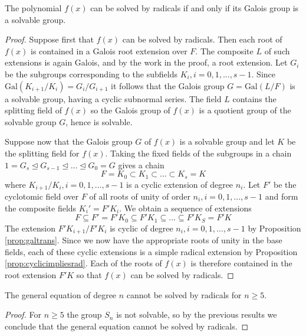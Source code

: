 \documentclass[12pt, a4paper, oneside, openright, titlepage]{book}
\begin{document}
\begin{thm}
    The polynomial $f(x)$ can be solved by radicals if and only if its Galois group is a solvable group.
\end{thm}
\begin{proof}
    Suppose first that $f(x)$ can be solved by radicals. Then each root of $f(x)$ is contained in a Galois root extension over $F$. The composite $L$ of such extensions is again Galois, and by the work in the proof, a root extension. Let $G_i$ be the subgroups corresponding to the subfields $K_i, i = 0,1,...,s-1$. Since $\text{Gal}(K_{i+1}/K_i)= G_i/G_{i+1}$ it follows that the Galois group $G = \text{Gal}(L/F)$ is a solvable group, having a cyclic subnormal series. The field $L$ contains the splitting field of $f(x)$ so the Galois group of $f(x)$ is a quotient group of the solvable group $G$, hence is solvable.

    Suppose now that the Galois group $G$ of $f(x)$ is a solvable group and let $K$ be the splitting field for $f(x)$. Taking the fixed fields of the subgroups in a chain $1 = G_s \trianglelefteq G_{s-1} \trianglelefteq ... \trianglelefteq G_0 = G$ gives a chain \begin{equation*}
        F = K_0 \subset K_1 \subset ... \subset K_s =K
    \end{equation*}
    where $K_{i+1}/K_i, i = 0,1,...,s-1$ is a cyclic extension of degree $n_i$. Let $F'$ be the cyclotomic field over $F$ of all roots of unity of order $n_i, i = 0,1,...,s-1$ and form the composite fields $K_i' = F'K_i$. We obtain a sequence of extensions \begin{equation*}
        F \subseteq F' = F'K_0 \subseteq F'K_1\subseteq ...\subseteq F'K_S = F'K
    \end{equation*}
    The extension $F'K_{i+1}/F'K_i$ is cyclic of degree $n_i, i = 0,1,...,s-1$ by Proposition \ref{prop:galtrans}. Since we now have the appropriate roots of unity in the base fields, each of these cyclic extensions is a simple radical extension by Proposition \ref{prop:cyclicimpliesrad}. Each of the roots of $f(x)$ is therefore contained in the root extension $F'K$ so that $f(x)$ can be solved by radicals.
\end{proof}


\begin{cor}
    The general equation of degree $n$ cannot be solved by radicals for $n \geq 5$.
\end{cor}
\begin{proof}
    For $n\geq 5$ the group $S_n$ is not solvable, so by the previous results we conclude that the general equation cannot be solved by radicals.
\end{proof}
\end{document}
